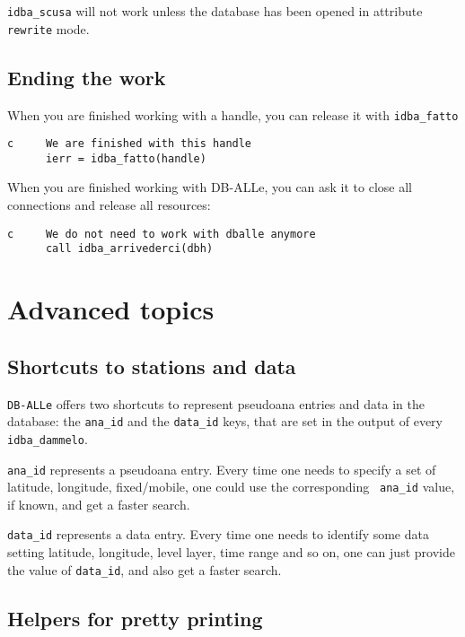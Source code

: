 \documentclass[final,12pt,a4paper,twoside]{book}
\newcommand{\dballe}{{\tt DB-ALLe}}
\begin{document}
{\tt idba\_scusa} will not work unless the database has been opened in
attribute {\tt rewrite} mode.


\section{Ending the work}

When you are finished working with a handle, you can release it with {\tt idba\_fatto}

\label{fun-idba_fatto}

\begin{verbatim}
c     We are finished with this handle
      ierr = idba_fatto(handle)
\end{verbatim}

When you are finished working with DB-ALLe, you can ask it to close all
connections and release all resources:

\label{fun-idba_arrivederci}

\begin{verbatim}
c     We do not need to work with dballe anymore
      call idba_arrivederci(dbh)
\end{verbatim}

\chapter{Advanced topics}

\section{Shortcuts to stations and data}

\dballe{} offers two shortcuts to represent pseudoana entries and data in the
database: the {\tt ana\_id} and the {\tt data\_id} keys, that are set in the
output of every {\tt idba\_dammelo}.

{\tt ana\_id} represents a pseudoana entry.  Every time one needs to specify a
set of latitude, longitude, fixed/mobile, one could use the corresponding {\tt
ana\_id} value, if known, and get a faster search.

{\tt data\_id} represents a data entry.  Every time one needs to identify some
data setting latitude, longitude, level layer, time range and so on, one can
just provide the value of {\tt data\_id}, and also get a faster search.

\section{Helpers for pretty printing}
\end{document}
